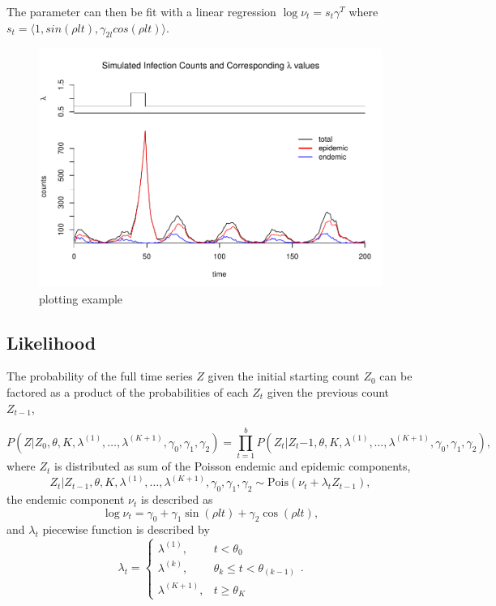\documentclass[11pt,a4paper]{article}
\numberwithin{equation}{section}
\begin{document}
The parameter can then be fit with a linear regression 
\(\log{\nu_t} = s_t\gamma^T\)
where 
\(s_t = \langle 1, sin(\rho l t), \gamma_{2l}cos(\rho l t) \rangle\).

\begin{figure}
\centering
\includegraphics{thesis_draft_files/figure-latex/simulation figure-1.pdf}
\caption{\label{fig:figs}plotting example}
\end{figure}

\hypertarget{likelihood}{%
\subsection{Likelihood}\label{likelihood}}

The probability of the full time series \(Z\) given the initial starting
count \(Z_0\) can be factored as a product of the probabilities of each
\(Z_t\) given the previous count \(Z_{t-1}\),

\[P(Z|Z_0,\theta, K, \lambda^{(1)}, \dots, \lambda^{(K+1)}, \gamma_0, \gamma_1, \gamma_2 ) = \prod_{t=1}^b P(Z_t|Z_t{-1}, \theta, K, \lambda^{(1)}, \dots, \lambda^{(K+1)}, \gamma_0, \gamma_1, \gamma_2),\]
where \(Z_t\) is distributed as sum of the Poisson endemic and epidemic
components,
\[Z_t|Z_{t-1}, \theta, K, \lambda^{(1)}, \dots, \lambda^{(K+1)}, \gamma_0, \gamma_1, \gamma_2 \sim\text{Pois}(\nu_t + \lambda_tZ_{t-1}),\]
the endemic component \(\nu_t\) is described as \del{,}
\[\log{\nu_t} = \gamma_0 +  \gamma_{1}\sin(\rho l t)+\gamma_{2}\cos(\rho l t),\]
and \(\lambda_t\) piecewise function is described by
\[ \lambda_t =  \begin{cases} \lambda^{(1)}, & t < \theta_0 \\
\lambda^{(k)}, & \theta_{k} \leq t < \theta_{(k-1)} \\
\lambda^{(K+1)}, & t \geq \theta_K \end{cases}.\]
\end{document}
